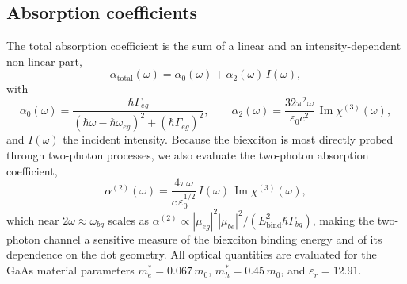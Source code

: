 \subsection{Absorption coefficients}

The total absorption coefficient is the sum of a linear and an
intensity-dependent non-linear part,
\begin{equation}
  \alpha_{\mathrm{total}}(\omega)=\alpha_0(\omega)+\alpha_2(\omega)\,I(\omega),
  \label{eq:abstot}
\end{equation}
with
\begin{equation}
  \alpha_0(\omega)=\frac{\hbar\Gamma_{eg}}
       {(\hbar\omega-\hbar\omega_{eg})^{2}+(\hbar\Gamma_{eg})^{2}},
  \qquad
  \alpha_2(\omega)=\frac{32\pi^{2}\omega}{\varepsilon_0 c^{2}}\,
       \operatorname{Im}\chi^{(3)}(\omega),
  \label{eq:abscoef}
\end{equation}
and $I(\omega)$ the incident intensity. Because the biexciton is most directly
probed through two-photon processes, we also evaluate the two-photon absorption
coefficient,
\begin{equation}
  \alpha^{(2)}(\omega)=\frac{4\pi\omega}{c\,\varepsilon_0^{1/2}}\,I(\omega)\,
  \operatorname{Im}\chi^{(3)}(\omega),
  \label{eq:twophoton}
\end{equation}
which near $2\omega\approx\omega_{bg}$ scales as
$\alpha^{(2)}\propto|\mu_{eg}|^{2}|\mu_{be}|^{2}/(E_{\mathrm{bind}}^{2}\hbar\Gamma_{bg})$,
making the two-photon channel a sensitive measure of the biexciton binding
energy and of its dependence on the dot geometry. All optical quantities are
evaluated for the GaAs material parameters $m_e^{*}=0.067\,m_0$,
$m_h^{*}=0.45\,m_0$, and $\varepsilon_r=12.91$.
